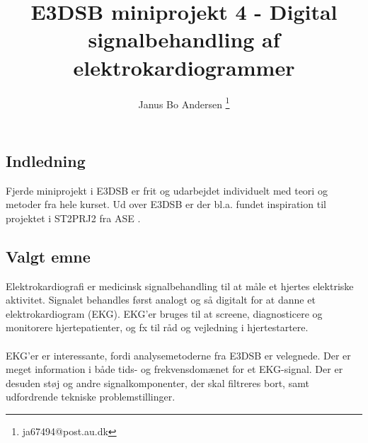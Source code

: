 \documentclass[a4paper]{report}
\author{Janus Bo Andersen \thanks{ja67494@post.au.dk}}
\begin{document}


    
    
    \title{E3DSB miniprojekt 4 - Digital signalbehandling af elektrokardiogrammer}
        

    \maketitle

\tableofcontents
\newpage


    \begin{par}

\chapter{Indledning}
Fjerde miniprojekt i E3DSB er frit og udarbejdet individuelt med teori og metoder fra hele kurset.
Ud over E3DSB er der bl.a. fundet inspiration til projektet i ST2PRJ2 fra ASE \cite{st2prj2}.

\end{par} 
\begin{par}

\section{Valgt emne}
Elektrokardiografi er medicinsk signalbehandling til at måle et hjertes elektriske aktivitet.
Signalet behandles først analogt og så digitalt for at danne et elektrokardiogram (EKG).
EKG'er bruges til at screene, diagnosticere og monitorere hjertepatienter, og fx til råd og vejledning i hjertestartere.
\\ \\
EKG'er er interessante, fordi analysemetoderne fra E3DSB er velegnede.
Der er meget information i både tids- og frekvensdomænet for et EKG-signal.
Der er desuden støj og andre signalkomponenter, der skal filtreres bort, samt udfordrende tekniske problemstillinger.

\end{par} 
\end{document}
